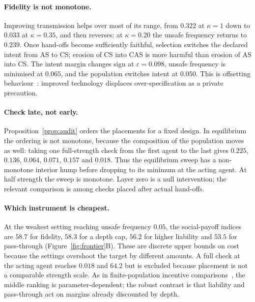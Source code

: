 \documentclass[a4paper,fleqn]{cas-sc}
\newcommand{\AS}{\textsf{AS}}
\newcommand{\CS}{\textsf{CS}}
\newcommand{\CAS}{\textsf{CAS}}
\begin{document}
\paragraph{Fidelity is not monotone.}
Improving transmission helps over most of its range, from $0.322$ at $\kappa=1$
down to $0.033$ at $\kappa=0.35$, and then reverses: at $\kappa=0.20$ the unsafe
frequency returns to $0.239$. Once hand-offs become sufficiently faithful,
selection switches the declared intent from \AS{} to \CS{}; erosion of \CS{}
into \CAS{} is more harmful than erosion of \AS{} into \CS{}. The intent
margin changes sign at $\varepsilon=0.098$, unsafe frequency is minimised at
$0.065$, and the population switches intent at $0.050$. This is offsetting
behaviour~\citep{peltzman1975automobile,viscusi1985consumer}: improved
technology displaces over-specification as a private precaution.

\paragraph{Check late, not early.}
Proposition~\ref{prop:audit} orders the placements for a fixed design. In
equilibrium the ordering is not monotone, because the composition of the
population moves as well: taking one full-strength check from the first agent
to the last gives $0.225$, $0.136$, $0.064$, $0.071$, $0.157$ and $0.018$. Thus
the equilibrium sweep has a non-monotone interior hump before dropping to its
minimum at the acting agent. At half strength the sweep is monotone. Layer zero
is a null intervention; the relevant
comparison is among checks placed after actual hand-offs.

\paragraph{Which instrument is cheapest.}
At the weakest setting reaching unsafe frequency $0.05$, the social-payoff
indices are $58.7$ for fidelity, $58.3$ for a depth cap, $56.2$ for higher
liability and $53.5$ for pass-through (Figure~\ref{fig:frontier}B). These are
discrete upper bounds on cost because the settings overshoot the target by
different amounts. A full check at the acting agent reaches $0.018$ and $64.2$
but is excluded because placement is not a comparable strength scale. As in
finite-population incentive comparisons~\citep{duong2021cost}, the middle
ranking is parameter-dependent; the robust contrast is that liability and
pass-through act on margins already discounted by depth.
\end{document}
